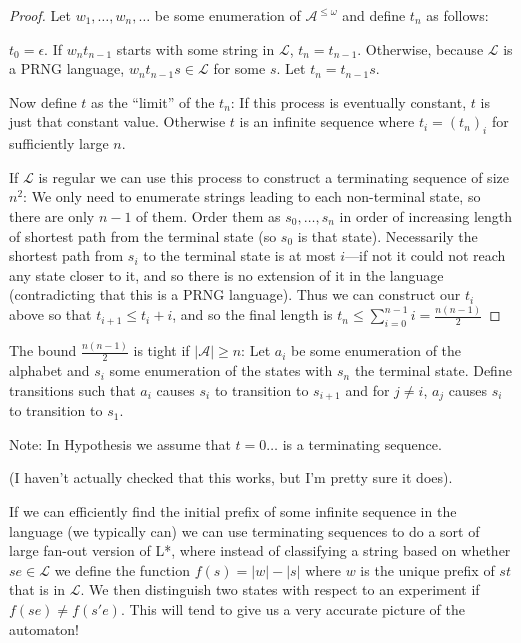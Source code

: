 \documentclass[a4paper]{book}
\begin{document}
\begin{proof}
Let \(w_1, \ldots, w_n, \ldots\) be some enumeration of \(\mathcal{A}^{\leq \omega}\) and define \(t_n\) as follows:

\(t_0 = \epsilon\).
If \(w_n t_{n - 1}\) starts with some string in \(\mathcal{L}\),
\(t_n = t_{n - 1}\).
Otherwise,
because \(\mathcal{L}\) is a PRNG language,
\(w_n t_{n - 1} s \in \mathcal{L}\) for some \(s\).
Let \(t_n = t_{n - 1} s\).

Now define \(t\) as the ``limit'' of the \(t_n\):
If this process is eventually constant, \(t\) is just that constant value.
Otherwise \(t\) is an infinite sequence where \(t_i = {(t_n)}_i\) for sufficiently large \(n\).

If \(\mathcal{L}\) is regular we can use this process to construct a terminating sequence of size \(n^2\):
We only need to enumerate strings leading to each non-terminal state,
so there are only \(n - 1\) of them.
Order them as \(s_0, \ldots, s_n\) in order of increasing length of shortest path from the terminal state (so \(s_0\) is that state).
Necessarily the shortest path from \(s_i\) to the terminal state is at most \(i\)---if not it could not reach any state closer to it,
and so there is no extension of it in the language (contradicting that this is a PRNG language).
Thus we can construct our \(t_i\) above so that \(t_{i + 1} \leq t_i + i\),
and so the final length is \(t_n \leq \sum\limits_{i = 0}^{n - 1} i = \frac{n(n - 1)}{2}\)

\end{proof}

The bound \(\frac{n(n - 1)}{2}\) is tight if \(|\mathcal{A}| \geq n\):
Let \(a_i\) be some enumeration of the alphabet and \(s_i\) some enumeration of the states with \(s_n\) the terminal state.
Define transitions such that \(a_i\) causes \(s_i\) to transition to \(s_{i + 1}\) and for \(j \neq i\),
\(a_j\) causes \(s_i\) to transition to \(s_1\).

Note: In Hypothesis we assume that \(t = 0\ldots\) is a terminating sequence.

(I haven't actually checked that this works, but I'm pretty sure it does).

If we can efficiently find the initial prefix of some infinite sequence in the language (we typically can) we can use terminating sequences to do a sort of large fan-out version of L*,
where instead of classifying a string based on whether \(se \in \mathcal{L}\) we define the function \(f(s) = |w| - |s|\) where \(w\) is the unique prefix of \(st\) that is in \(\mathcal{L}\).
We then distinguish two states with respect to an experiment if \(f(se) \neq f(s'e)\).
This will tend to give us a very accurate picture of the automaton!
\end{document}
